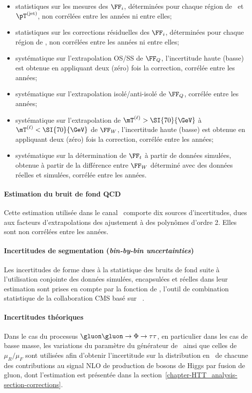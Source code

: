 \begin{itemize}
\item statistiques sur les mesures des $\FF_i$, déterminées pour chaque région de \Njets\ et $\pT^{(\text{jet})}$, non corrélées entre les années ni entre elles;
\item statistiques sur les corrections résiduelles des $\FF_i$, déterminées pour chaque région de \Njets, non corrélées entre les années ni entre elles;
\item systématique sur l'extrapolation OS/SS de $\FF_Q$, l'incertitude haute (basse) est obtenue en appliquant deux (zéro) fois la correction, corrélée entre les années;
\item systématique sur l'extrapolation isolé/anti-isolé de $\FF_Q$, corrélée entre les années;
\item systématique sur l'extrapolation de $\mT^{(\ell)}>\SI{70}{\GeV}$ à $\mT^{(\ell)}<\SI{70}{\GeV}$ de $\FF_W$, l'incertitude haute (basse) est obtenue en appliquant deux (zéro) fois la correction, corrélée entre les années;
\item systématique sur la détermination de $\FF_t$ à partir de données simulées, obtenue à partir de la différence entre $\FF_W$ déterminé avec des données réelles et simulées, corrélée entre les années.
\end{itemize}
\paragraph{Estimation du bruit de fond QCD}
Cette estimation utilisée dans le canal \ele\mu\ comporte dix sources d'incertitudes, dues aux facteurs d'extrapolations des ajustement à des polynômes d'ordre 2.
Elles sont non corrélées entre les années.
\paragraph{Incertitudes de segmentation (\emph{bin-by-bin uncertainties})}
Les incertitudes de forme dues à la statistique des bruits de fond suite à l'utilisation conjointe des données simulées, encapsulées et réelles dans leur estimation sont prises en compte par la fonction  de \COMBINE, l'outil de combination statistique de la collaboration CMS basé sur \ROOSTATS~\cite{RooStats}.
\paragraph{Incertitudes théoriques}
Dans le cas du processus $\gluon\gluon\to\Phi\to\tau\tau$, en particulier dans les cas de basse masse,
les variations du paramètre  du générateur de \POWHEG\ ainsi que
celles de $\mu_R/\mu_F$ sont utilisées afin d'obtenir l'incertitude sur la distribution en \pT\ de chacune des contributions
au signal NLO de production de bosons de Higgs par fusion de gluon, dont l'estimation est présentée dans la section~\ref{chapter-HTT_analysis-section-corrections}.